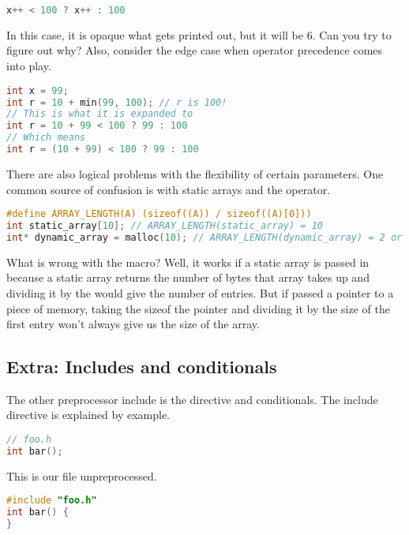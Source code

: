 \begin{lstlisting}[language=C]
x++ < 100 ? x++ : 100
\end{lstlisting}

In this case, it is opaque what gets printed out, but it will be 6.
Can you try to figure out why?
Also, consider the edge case when \gls{operator precedence} comes into play.

\begin{lstlisting}[language=C]
int x = 99;
int r = 10 + min(99, 100); // r is 100!
// This is what it is expanded to
int r = 10 + 99 < 100 ? 99 : 100
// Which means
int r = (10 + 99) < 100 ? 99 : 100
\end{lstlisting}

There are also logical problems with the flexibility of certain parameters.
One common source of confusion is with static arrays and the  operator.

\begin{lstlisting}[language=C]
#define ARRAY_LENGTH(A) (sizeof((A)) / sizeof((A)[0]))
int static_array[10]; // ARRAY_LENGTH(static_array) = 10
int* dynamic_array = malloc(10); // ARRAY_LENGTH(dynamic_array) = 2 or 1 consistently
\end{lstlisting}

What is wrong with the macro?
Well, it works if a \gls{static array} is passed in because  a static array returns the number of bytes that array takes up and dividing it by the  would give the number of entries.
But if passed a pointer to a piece of memory, taking the sizeof the pointer and dividing it by the size of the first entry won't always give us the size of the array.

\subsection{Extra: Includes and conditionals}

The other preprocessor include is the  directive and conditionals.
The include directive is explained by example.

\begin{lstlisting}[language=C]
// foo.h
int bar();
\end{lstlisting}

This is our file  unpreprocessed.

\begin{lstlisting}[language=C]
#include "foo.h"
int bar() {
}
\end{lstlisting}

